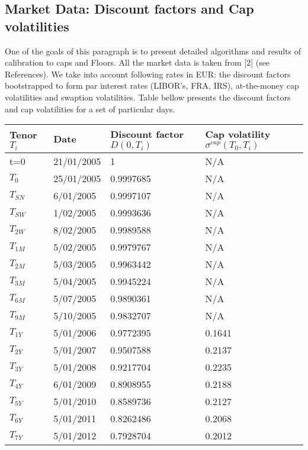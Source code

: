 \documentclass[11pt]{article}
\numberwithin{equation}{subsection}
\begin{document}
\subsection{Market Data: Discount factors and Cap volatilities}
One of the goals of this paragraph is to present detailed algorithms and results of calibration to caps and Floors.
All the market data is taken from [2] (see References). We take into account following rates in EUR: the discount factors bootstrapped to form par interest rates (LIBOR's, FRA, IRS), at-the-money cap volatilities and swaption volatilities. Table bellow presents the discount factors and cap volatilities for a set of particular days.
\vskip 0.4cm 		
{
	\centering
	\begin{tabular}{|l|l|l|l|}
		\hline
		Tenor \(T_i\) & Date & Discount factor \(D(0, T_i)\) & Cap volatility \(\sigma^{cap}(T_0, T_i)\) \\		
		\hline		
		t=0	  &  21/01/2005 &  1	      &  N/A \\
		\hline
		\(T_0\)	  &  25/01/2005 &  0.9997685  &  N/A \\
		\hline
		\(T_{SN}\)  &  6/01/2005  &  0.9997107  &  N/A \\
		\hline
		\(T_{SW}\)  &  1/02/2005  &  0.9993636  &  N/A \\
		\hline
		\(T_{2W}\)  &  8/02/2005  &  0.9989588  &  N/A \\
		\hline
		\(T_{1M}\)  &  5/02/2005  &  0.9979767  &  N/A \\
		\hline
		\(T_{2M}\)  &  5/03/2005  &  0.9963442  &  N/A \\
		\hline
		\(T_{3M}\)  &  5/04/2005  &  0.9945224  &  N/A \\
		\hline
		\(T_{6M}\)  &  5/07/2005  &  0.9890361  &  N/A \\
		\hline
		\(T_{9M}\)  &  5/10/2005  &  0.9832707  &  N/A \\
		\hline
		\(T_{1Y}\)  &  5/01/2006  &  0.9772395  &  0.1641 \\
		\hline
		\(T_{2Y}\)  &  5/01/2007  &  0.9507588  &  0.2137 \\
		\hline
		\(T_{3Y}\)  &  5/01/2008  &  0.9217704  &  0.2235 \\
		\hline
		\(T_{4Y}\)  &  6/01/2009  &  0.8908955  &  0.2188 \\
		\hline
		\(T_{5Y}\)  &  5/01/2010  &  0.8589736  &  0.2127 \\
		\hline
		\(T_{6Y}\)  &  5/01/2011  &  0.8262486  &  0.2068 \\
		\hline
		\(T_{7Y}\)  &  5/01/2012  &  0.7928704  &  0.2012 \\

\end{tabular}}
\end{document}
